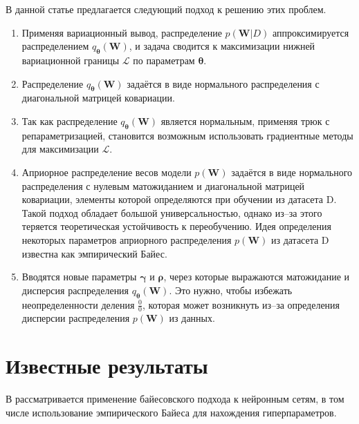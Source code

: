 \documentclass{article}
\numberwithin{equation}{section}
\begin{document}
    В данной статье предлагается следующий подход к решению этих проблем.

    \begin{enumerate}
        \item Применяя вариационный вывод, распределение $p(\pmb{W}| D)$
            аппроксимируется распределением $q_{\pmb{\theta}}(\pmb{W})$,
            и задача сводится к максимизации нижней вариационной границы
            $\mathcal{L}$ по параметрам $\pmb{\theta}$.
        \item Распределение $q_{\pmb{\theta}}(\pmb{W})$
            задаётся в виде нормального распределения с диагональной матрицей ковариации.
        \item Так как распределение $q_{\pmb{\theta}}(\pmb{W})$
            является нормальным, применяя трюк с репараметризацией,
            становится возможным использовать градиентные методы
            для максимизации $\mathcal{L}$.
        \item Априорное распределение весов модели $p(\pmb{W})$
            задаётся в виде нормального распределения с нулевым матожиданием
            и диагональной матрицей ковариации, элементы которой определяются при обучении из датасета D.
            Такой подход обладает большой универсальностью,
            однако из--за этого теряется теоретическая устойчивость к переобучению.
            Идея определения некоторых параметров априорного распределения
            $p(\pmb{W})$ из датасета D
            известна как эмпирический Байес.
        \item Вводятся новые параметры $\pmb{\gamma}$ и $\pmb{\rho}$,
            через которые выражаются матожидание и дисперсия распределения
            $q_{\pmb{\theta}}(\pmb{W})$.
            Это нужно, чтобы избежать неопределенности деления $\frac{0}{0}$,
            которая может возникнуть из--за определения дисперсии распределения $p(\pmb{W})$ из данных.
    \end{enumerate}

    \section{Известные результаты}

    В \cite{mackay_1992a, mackay_1992b, mackay_1992c}
    рассматривается применение байесовского подхода к нейронным сетям,
    в том числе использование эмпирического Байеса
    для нахождения гиперпараметров.
\end{document}
